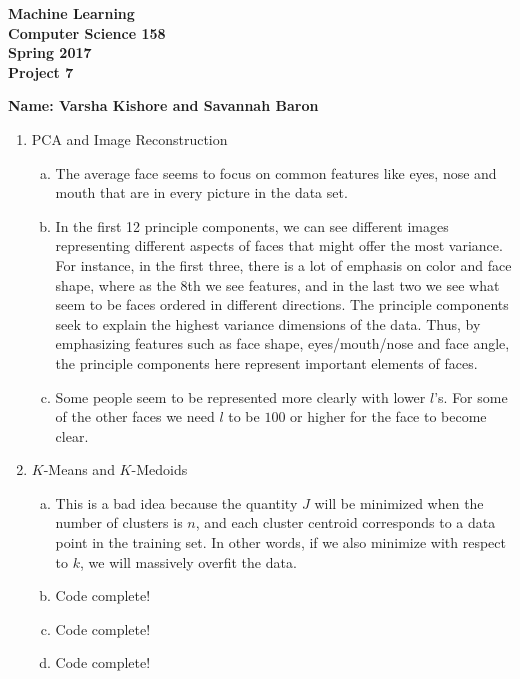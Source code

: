 \documentclass[11pt]{article}
\begin{document}
\newcommand{\Name}[1]{\noindent \textbf{Name:} #1 \\}
\newcommand{\pderiv}[2]{\frac{\partial #1}{\partial #2}}
\newcommand{\psderiv}[3]{\frac{\partial^2 #1}{\partial #2 \partial #3}}

\begin{center}
	\bf
	Machine Learning \\
	Computer Science 158 \\
	Spring 2017 \\
	\rm
	Project 7\\
\end{center}
\noindent \textbf{Name: Varsha Kishore and Savannah Baron} \\

\begin{enumerate}[1]
\item PCA and Image Reconstruction
\begin{enumerate}[(a)]
\item The average face seems to focus on common features like eyes, nose and mouth that are in every picture in the data set. 
\item In the first 12 principle components, we can see different images representing different aspects of faces that might offer the most variance. For instance, in the first three, there is a lot of emphasis on color and face shape, where as the 8th we see features, and in the last two we see what seem to be faces ordered in different directions.  The principle components seek to explain the highest variance dimensions of the data. Thus, by emphasizing features such as face shape, eyes/mouth/nose and face angle, the principle components here represent important elements of faces.
\item Some people seem to be represented more clearly with lower $l$'s. For some of the other faces we need $l$ to be $100$ or higher for the face to become clear. 
\end{enumerate}
\item $K$-Means and $K$-Medoids
\begin{enumerate}[(a)]
\item This is a bad idea because the quantity $J$ will be minimized when the number of clusters
is $n$, and each cluster centroid corresponds to a data point in the training set. In other words, if we
also minimize with respect to $k$, we will massively overfit the data. 
\item Code complete!
\item Code complete!
\item Code complete!

\end{enumerate}
\end{enumerate}
\end{document}
